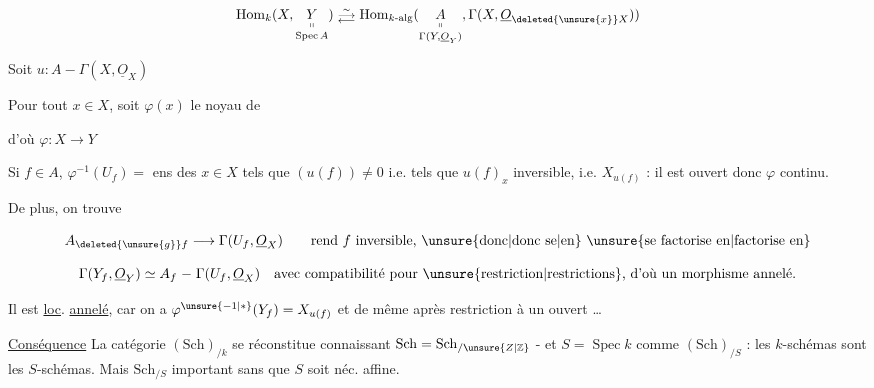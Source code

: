 \[
 \operatorname{Hom}_k(X,\underset{\operatorname{Spec} A}{\underset{\shortparallel}{Y}})
 \mathrel{\substack{\overset{\sim}{\longrightarrow}\\[-2pt]\longleftarrow}}
 \operatorname{Hom}_{k\text{-alg}}(\underset{\Gamma(Y,\underline O_Y)}{\underset{\shortparallel}{A}},\Gamma(X,\underline O_{\deleted{\unsure{x}}X}))
\]

 Soit $u:A\mathrel{-}\Gamma(X,\underline O_X)$

Pour tout $x\in X$, soit $\varphi(x)$  le noyau de


d'où $\varphi:X\longrightarrow Y$

Si $f\in A$, $\varphi^{-1}(U_f)={}$ ens des $x\in X$ tels que $(u(f))\ne 0$ i.e. tels que $u(f)_x$ inversible, i.e. $X_{u(f)}$ : il est ouvert donc $\varphi$ continu.

De plus, on trouve

\[ A_{\deleted{\unsure{g}}f}\longrightarrow\Gamma(U_f,\underline O_X)\qquad\text{rend $f$ inversible, \unsure{donc|donc se|en} \unsure{se factorise en|factorise en}} \]

\[ \Gamma(Y_f,\underline O_Y)\simeq A_f\mathrel{-}\Gamma(U_f,\underline O_X)\quad\text{avec compatibilité pour \unsure{restriction|restrictions}, d'où un morphisme annelé.} \]

Il est \uline{loc}. \uline{annelé}, car   on a $\varphi^{\unsure{-1|*}}(Y_f)=X_{u(f)}$ et de même après restriction à un ouvert \ldots

\uline{Conséquence} La catégorie $(\mathrm{Sch})_{/k}$ se réconstitue connaissant $\mathrm{Sch}=\mathrm{Sch}_{/\unsure{Z|\mathbb Z}}$ - et $S=\operatorname{Spec} k$ comme $(\mathrm{Sch})_{/S}$ : les $k$-schémas sont les $S$-schémas. Mais $\mathrm{Sch}_{/S}$ important sans que $S$ soit néc. affine.

